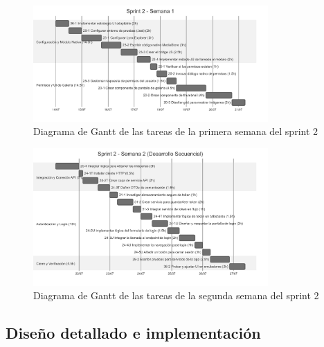 \begin{figure}[H]
    \begin{center}
        \includegraphics[width=0.8\textwidth]{assets/sprint2/week1-gantt.png}
    \end{center}
    \caption{Diagrama de Gantt de las tareas de la primera semana del sprint 2}\label{fig:gantt-sprint2-week1}
\end{figure}

\begin{figure}[H]
    \begin{center}
        \includegraphics[width=0.8\textwidth]{assets/sprint2/week2-gantt.png}
    \end{center}
    \caption{Diagrama de Gantt de las tareas de la segunda semana del sprint 2}\label{fig:gantt-sprint2-week2}
\end{figure}


\subsection{Diseño detallado e implementación}

